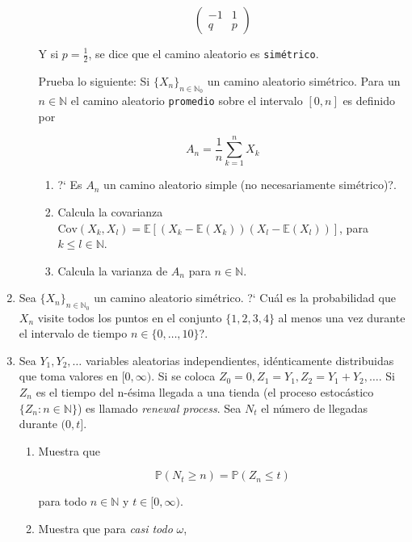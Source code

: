 \documentclass[a4paper,11pt]{report}
\newcommand{\PR}{\mathbb{P}}
\begin{document}
\begin{enumerate}
\begin{enumerate}
	\[
	\begin{pmatrix}
	- 1 &  1 \\
	 q & p
	\end{pmatrix}
	\]
	
Y si $p = \frac{1}{2}$, se dice que el camino aleatorio es \texttt{sim\'etrico}.

\vspace{0.3cm}

Prueba lo siguiente: Si $\{ X_n\}_{n \in \mathbb{N}_{0}}$ un camino aleatorio sim\'etrico. Para un $n \in  \mathbb{N}$ el camino aleatorio \texttt{promedio} sobre el intervalo $[0, n]$ es definido por

\[
A_n = \frac{1}{n}\sum_{k = 1}^{n}X_k
\]

\begin{enumerate}
	\item ?` Es $A_n$ un camino aleatorio simple (no necesariamente sim\'etrico)?.
	\item Calcula la covarianza $\text{Cov}(X_k, X_l) = \mathbb{E}[(X_k - \mathbb{E}(X_k))(X_l - \mathbb{E}(X_l))]$, para $k \leq l \in \mathbb{N}$.
	\item Calcula la varianza de $A_n$ para $n \in \mathbb{N}$. 
\end{enumerate}

	
\end{enumerate}
\item Sea $\{ X_n\}_{n \in \mathbb{N}_{0}}$ un camino aleatorio sim\'etrico. ?` Cu\'al es la probabilidad que $X_n$ visite todos los puntos en el conjunto $\{1,2, 3, 4  \}$ al menos una vez durante el intervalo de tiempo $n \in \{ 0, \dots, 10\}$?.

\item Sea $Y_1, Y_2, \dots$ variables aleatorias independientes, id\'enticamente distribuidas que toma valores en $[0, \infty)$. Si se coloca $Z_0 = 0, Z_1 = Y_1, Z_2 = Y_1 + Y_2, \dots$. Si $Z_n$ es el tiempo del n-\'esima llegada a una tienda (el proceso estoc\'astico $\{ Z_n: n \in \mathbb{N}\}$) es llamado \textit{renewal process}. Sea $N_{t}$ el n\'umero de llegadas durante $(0, t]$.

\begin{enumerate}
	\item Muestra que
	
	\[
	\PR(N_t \geq n) = \PR(Z_n \leq t)
	\]
	
	para todo $n \in \mathbb{N}$ y $t \in [0, \infty)$.
	
	\item Muestra que para \textit{casi todo } $\omega$,
	

\end{enumerate}
\end{enumerate}
\end{document}
